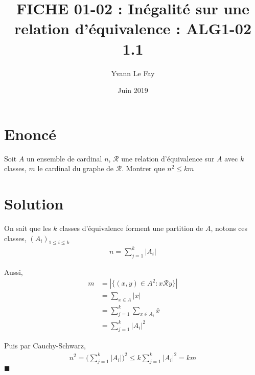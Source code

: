 \documentclass{article}
\newcommand*{\QED}{\hfill\ensuremath{\blacksquare}}%
\begin{document}
\title{FICHE 01-02 : Inégalité sur une relation d'équivalence : ALG1-02 1.1}
\author{Yvann Le Fay}
\date{Juin 2019}
\maketitle

\section*{Enoncé}
Soit $A$ un ensemble de cardinal $n$, $\mathcal{R}$ une relation d'équivalence sur $A$ avec $k$ classes, $m$ le cardinal du graphe de $\mathcal{R}$. Montrer que $n^2\leq km$
\section*{Solution}
On sait que les $k$ classes d'équivalence forment une partition de $A$, notons ces classes, $(A_i)_{1\leq i\leq k}$
\begin{align*}
n = \sum_{j=1}^k |A_i|
\end{align*}

Aussi, 
\begin{align*}
m &= |\{(x,y)\in A^2 : x \mathcal{R} y\}|\\
&=\sum_{x\in A} |\bar{x}|\\
&=\sum_{j=1}^k \sum_{x\in A_i}{\bar{x}}\\
&=\sum_{j=1}^k |A_i|^2 
\end{align*}

Puis par Cauchy-Schwarz, 
\begin{align*}
n^2 =\bigg( \sum_{j=1}^k |A_i|\bigg)^2 \leq k \sum_{j=1}^k |A_i|^2 = km
\end{align*}
\QED
\end{document}
